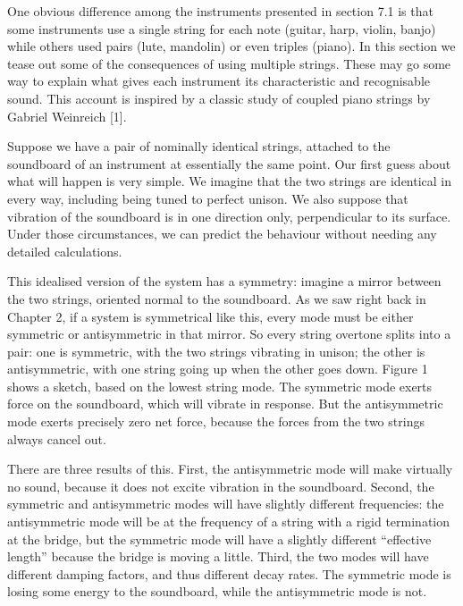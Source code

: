 

  One obvious difference among the instruments presented in section 7.1 is that 
  some instruments use a single string for each note (guitar, harp, violin, 
  banjo) while others used pairs (lute, mandolin) or even triples (piano). In 
  this section we tease out some of the consequences of using multiple strings. 
  These may go some way to explain what gives each instrument its 
  characteristic and recognisable sound. This account is inspired by a classic 
  study of coupled piano strings by Gabriel Weinreich [1]. 

  Suppose we have a pair of nominally identical strings, attached to the 
  soundboard of an instrument at essentially the same point. Our first guess 
  about what will happen is very simple. We imagine that the two strings are 
  identical in every way, including being tuned to perfect unison. We also 
  suppose that vibration of the soundboard is in one direction only, 
  perpendicular to its surface. Under those circumstances, we can predict the 
  behaviour without needing any detailed calculations. 

  This idealised version of the system has a symmetry: imagine a mirror between 
  the two strings, oriented normal to the soundboard. As we saw right back in 
  Chapter 2, if a system is symmetrical like this, every mode must be either 
  symmetric or antisymmetric in that mirror. So every string overtone splits 
  into a pair: one is symmetric, with the two strings vibrating in unison; the 
  other is antisymmetric, with one string going up when the other goes down. 
  Figure 1 shows a sketch, based on the lowest string mode. The symmetric mode 
  exerts force on the soundboard, which will vibrate in response. But the 
  antisymmetric mode exerts precisely zero net force, because the forces from 
  the two strings always cancel out. 

  There are three results of this. First, the antisymmetric mode will make 
  virtually no sound, because it does not excite vibration in the soundboard. 
  Second, the symmetric and antisymmetric modes will have slightly different 
  frequencies: the antisymmetric mode will be at the frequency of a string with 
  a rigid termination at the bridge, but the symmetric mode will have a 
  slightly different “effective length” because the bridge is moving a little. 
  Third, the two modes will have different damping factors, and thus different 
  decay rates. The symmetric mode is losing some energy to the soundboard, 
  while the antisymmetric mode is not. 

